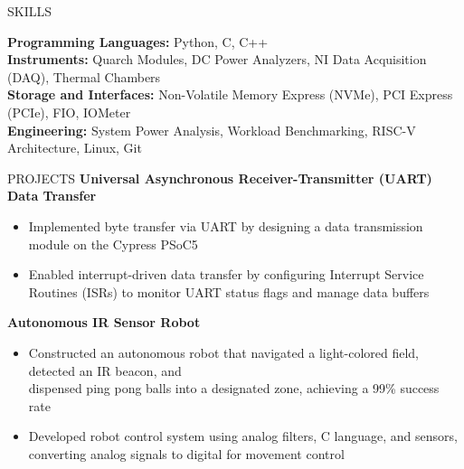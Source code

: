 \documentclass{resume} %
\begin{document}
\vspace{3mm}

\begin{rSection}{\large SKILLS}


\textbf{Programming Languages: }Python, C, C++ \\
\textbf{Instruments: }Quarch Modules, DC Power Analyzers, NI Data Acquisition (DAQ), Thermal Chambers\\
\textbf{Storage and Interfaces: }Non-Volatile Memory Express (NVMe), PCI Express (PCIe), FIO, IOMeter\\
\textbf{Engineering: }System Power Analysis, Workload Benchmarking, RISC-V Architecture, Linux, Git
\end{rSection}


\vspace{3mm}

\begin{rSection}{\large PROJECTS}
\textbf{Universal Asynchronous Receiver-Transmitter (UART) Data Transfer} \hfill {}
  \begin{itemize}[left=0em]
  \itemsep -0.5em \vspace{-0.5em}
    \item Implemented byte transfer via UART by designing a data transmission module on the Cypress PSoC5
    \item Enabled interrupt-driven data transfer by configuring Interrupt Service Routines (ISRs) to monitor UART status flags and manage data buffers
  \end{itemize}


 \textbf{Autonomous IR Sensor Robot} \hfill {}
  \begin{itemize}[left=0em]
  \itemsep -0.5em \vspace{-0.5em}
    \item Constructed an autonomous robot that navigated a light-colored field, detected an IR beacon, and \\ dispensed ping pong balls into a designated zone, achieving a 99\% success rate
    \item Developed robot control system using analog filters, C language, and sensors, converting analog signals to digital for movement control
  \end{itemize}


\end{rSection}
\end{document}
